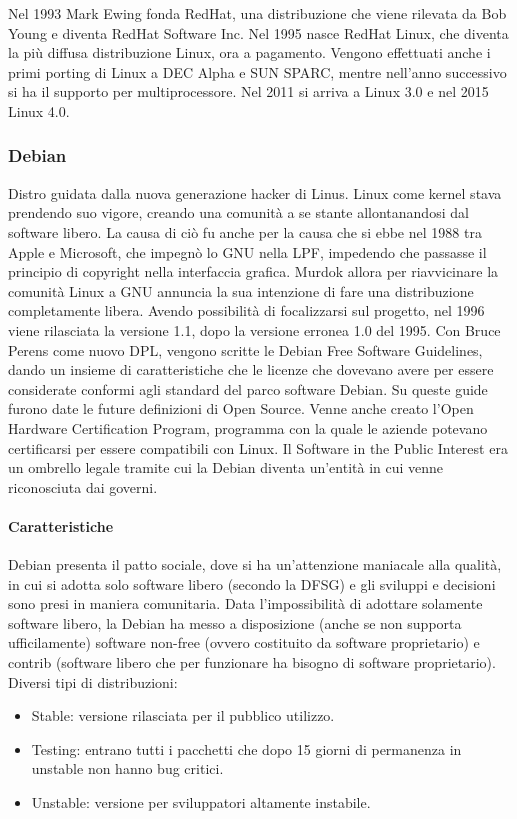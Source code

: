 Nel 1993 Mark Ewing fonda RedHat, una distribuzione che viene rilevata da Bob Young e diventa RedHat Software Inc. Nel 1995 nasce RedHat Linux, che diventa la pi\`u diffusa distribuzione Linux, ora a pagamento. Vengono effettuati anche i primi porting di Linux a DEC Alpha e SUN SPARC, mentre nell'anno successivo si ha il supporto per multiprocessore. Nel 2011 si arriva a Linux 3.0 e nel 2015 Linux 4.0.

\subsubsection{Debian}

Distro guidata dalla nuova generazione hacker di Linus. Linux come kernel stava prendendo suo vigore, creando una comunit\`a a se stante allontanandosi dal software libero. La causa di ci\`o fu anche per la causa che si ebbe nel 1988 tra Apple e Microsoft, che impegn\`o lo GNU nella LPF, impedendo che passasse il principio di copyright nella interfaccia grafica. Murdok allora per riavvicinare la comunit\`a Linux a GNU annuncia la sua intenzione di fare una distribuzione completamente libera. Avendo possibilit\`a di focalizzarsi sul progetto, nel 1996 viene rilasciata la versione 1.1, dopo la versione erronea 1.0 del 1995. Con Bruce Perens come nuovo DPL, vengono scritte le Debian Free Software Guidelines, dando un insieme di caratteristiche che le licenze che dovevano avere per essere considerate conformi agli standard del parco software Debian. Su queste guide furono date le future definizioni di Open Source. Venne anche creato l'Open Hardware Certification Program, programma con la quale le aziende potevano certificarsi per essere compatibili con Linux. Il Software in the Public Interest era un ombrello legale tramite cui la Debian diventa un'entit\`a in cui venne riconosciuta dai governi.

\paragraph*{Caratteristiche} Debian presenta il patto sociale, dove si ha un'attenzione maniacale alla qualit\`a, in cui si adotta solo software libero (secondo la DFSG) e gli sviluppi e decisioni sono presi in maniera comunitaria. Data l'impossibilit\`a di adottare solamente software libero, la Debian ha messo a disposizione (anche se non supporta ufficilamente) software non-free (ovvero costituito da software proprietario) e contrib (software libero che per funzionare ha bisogno di software proprietario). Diversi tipi di distribuzioni:
\begin{itemize}
  
\item Stable: versione rilasciata per il pubblico utilizzo.
\item Testing: entrano tutti i pacchetti che dopo 15 giorni di permanenza in unstable non hanno bug critici.
\item Unstable: versione per sviluppatori altamente instabile.

\end{itemize}

